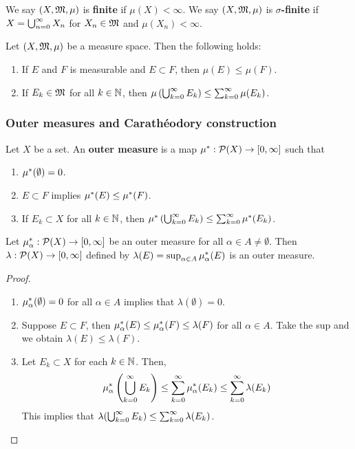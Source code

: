 \documentclass[a4paper]{article}
\begin{document}
\begin{defi}
  We say $(X, \mf, \mu)$ is \textbf{finite} if 
  $\mu(X) < \infty$. We say $(X, \mf, \mu)$ is 
  \textbf{$\sigma$-finite} if $X = \cupinfn X_n$ for 
  $X_n \in \mf$ and $\mu(X_n) < \infty$.
\end{defi}

\begin{thm}
  Let $(X, \mf, \mu)$ be a measure space. Then the 
  following holds: 
  \begin{enumerate}
    \item If $E$ and $F$ is measurable and $E \subset F$, 
    then $\mu(E) \leq \mu(F)$.

    \item If $E_k \in \mf$ for all $k \in \N$, then 
    $\mu \left( \cupinfk E_k \right) \leq \suminfk \mu(E_k)$.
  \end{enumerate}
\end{thm}

\subsubsection{Outer measures and Carath\'eodory construction}

\begin{defi}
  Let $X$ be a set. An \textbf{outer measure} is a map 
  $\om: \P(X) \to [0, \infty]$ such that 
  \begin{enumerate}
    \item $\om(\emptyset) = 0$.
    \item $E \subset F$ implies $\om(E) \leq \om(F)$.
    \item If $E_k \subset X$ for all $k \in \N$, then 
    $\om \left( \cupinfk E_k \right) \leq \suminfk \om(E_k)$.
  \end{enumerate}
\end{defi}

\begin{prop}
  Let $\om_\alpha: \P(X) \to [0, \infty]$ be an outer 
  measure for all $\alpha \in A \neq \emptyset$. 
  Then $\lambda: \P(X) \to [0, \infty]$ defined by 
  $\lambda(E) = \sup_{\alpha \in A} \om_\alpha(E)$
  is an outer measure.
\end{prop}

\begin{proof}
\begin{enumerate}
  \item $\om_\alpha(\emptyset) = 0$ for all $\alpha \in A$
  implies that $\lambda(\emptyset) = 0$.

  \item Suppose $E \subset F$, then $\om_\alpha(E) 
  \leq \om_\alpha(F) \leq \lambda(F)$ for all $\alpha \in A$.
  Take the sup and we obtain $\lambda(E) \leq \lambda(F)$.

  \item Let $E_k \subset X$ for each $k \in \N$. 
  Then, 
  \[
  \om_\alpha \left( \cupinfk E_k \right) 
  \leq \suminfk \om_\alpha (E_k) 
  \leq \suminfk \lambda(E_k) 
  \]
  This implies that $\lambda(\cupinfk E_k) \leq \suminfk 
  \lambda(E_k)$.
\end{enumerate}
\end{proof}
\end{document}
